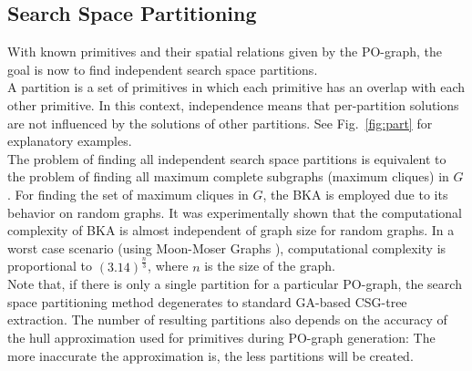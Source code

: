 \subsection{Search Space Partitioning}
With known primitives and their spatial relations given by the \ac{PO}-graph, the goal is now to find independent search space partitions. 
\\
A partition is a set of primitives in which each primitive has an overlap with each other primitive.
In this context, independence means that per-partition solutions are not influenced by the solutions of other partitions.
See Fig.~\ref{fig:part} for explanatory examples. 
\\
The problem of finding all independent search space partitions is equivalent to the problem of finding all maximum complete subgraphs (maximum cliques) in $G$.
For finding the set of maximum cliques in $G$, the \ac{BKA}\cite{bron1973cliques} is employed due to its behavior on random graphs.
It was experimentally shown \cite{bron1973cliques} that the computational complexity of \ac{BKA} is almost independent of graph size for random graphs.
In a worst case scenario (using Moon-Moser Graphs \cite{moon1965cliques}), computational complexity is proportional to $(3.14)^{\frac{n}{3}}$, where $n$ is the size of the graph.
\\
Note that, if there is only a single partition for a particular \ac{PO}-graph, the search space partitioning method degenerates to standard \ac{GA}-based \ac{CSG}-tree extraction. 
The number of resulting partitions also depends on the accuracy of the hull approximation used for primitives during \ac{PO}-graph generation: 
The more inaccurate the approximation is, the less partitions will be created.
